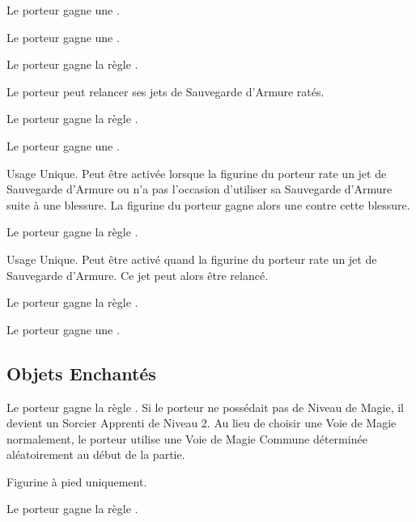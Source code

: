 \startpricelist

Le porteur gagne une .

Le porteur gagne une .

Le porteur gagne la règle .

Le porteur peut relancer ses jets de Sauvegarde d'Armure ratés.

Le porteur gagne la règle .

Le porteur gagne une .

Usage Unique. Peut être activée lorsque la figurine du porteur rate un jet de Sauvegarde d'Armure ou n'a pas l'occasion d'utiliser sa Sauvegarde d'Armure suite à une blessure. La figurine du porteur gagne alors une  contre cette blessure.

Le porteur gagne la règle .

Usage Unique. Peut être activé quand la figurine du porteur rate un jet de Sauvegarde d'Armure. Ce jet peut alors être relancé.

Le porteur gagne la règle \fireborn{}.

Le porteur gagne une .

\endpricelist

\newpage
\hypertarget{enchanteditems}{\subsection{Objets Enchantés}}
\label{enchanted_items}

\startpricelist

Le porteur gagne la règle \stupidity{}. Si le porteur ne possédait pas de Niveau de Magie, il devient un Sorcier Apprenti de Niveau 2. Au lieu de choisir une Voie de Magie normalement, le porteur utilise une Voie de Magie Commune déterminée aléatoirement au début de la partie.

Figurine à pied uniquement.

Le porteur gagne la règle .

